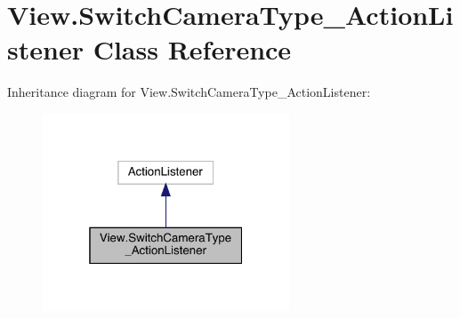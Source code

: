 \hypertarget{class_view_1_1_switch_camera_type___action_listener}{}\section{View.\+Switch\+Camera\+Type\+\_\+\+Action\+Listener Class Reference}
\label{class_view_1_1_switch_camera_type___action_listener}


Inheritance diagram for View.\+Switch\+Camera\+Type\+\_\+\+Action\+Listener\+:
\nopagebreak
\begin{figure}[H]
\begin{center}
\leavevmode
\includegraphics[width=208pt]{class_view_1_1_switch_camera_type___action_listener__inherit__graph}
\end{center}
\end{figure}



